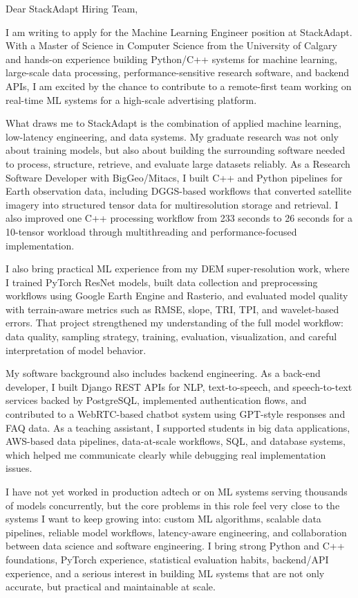 \documentclass[11pt]{letter}
\begin{document}
\begin{letter}{}

\opening{Dear StackAdapt Hiring Team,}

I am writing to apply for the Machine Learning Engineer position at StackAdapt. With a Master of Science in Computer Science from the University of Calgary and hands-on experience building Python/C++ systems for machine learning, large-scale data processing, performance-sensitive research software, and backend APIs, I am excited by the chance to contribute to a remote-first team working on real-time ML systems for a high-scale advertising platform.

What draws me to StackAdapt is the combination of applied machine learning, low-latency engineering, and data systems. My graduate research was not only about training models, but also about building the surrounding software needed to process, structure, retrieve, and evaluate large datasets reliably. As a Research Software Developer with BigGeo/Mitacs, I built C++ and Python pipelines for Earth observation data, including DGGS-based workflows that converted satellite imagery into structured tensor data for multiresolution storage and retrieval. I also improved one C++ processing workflow from 233 seconds to 26 seconds for a 10-tensor workload through multithreading and performance-focused implementation.

I also bring practical ML experience from my DEM super-resolution work, where I trained PyTorch ResNet models, built data collection and preprocessing workflows using Google Earth Engine and Rasterio, and evaluated model quality with terrain-aware metrics such as RMSE, slope, TRI, TPI, and wavelet-based errors. That project strengthened my understanding of the full model workflow: data quality, sampling strategy, training, evaluation, visualization, and careful interpretation of model behavior.

My software background also includes backend engineering. As a back-end developer, I built Django REST APIs for NLP, text-to-speech, and speech-to-text services backed by PostgreSQL, implemented authentication flows, and contributed to a WebRTC-based chatbot system using GPT-style responses and FAQ data. As a teaching assistant, I supported students in big data applications, AWS-based data pipelines, data-at-scale workflows, SQL, and database systems, which helped me communicate clearly while debugging real implementation issues.

I have not yet worked in production adtech or on ML systems serving thousands of models concurrently, but the core problems in this role feel very close to the systems I want to keep growing into: custom ML algorithms, scalable data pipelines, reliable model workflows, latency-aware engineering, and collaboration between data science and software engineering. I bring strong Python and C++ foundations, PyTorch experience, statistical evaluation habits, backend/API experience, and a serious interest in building ML systems that are not only accurate, but practical and maintainable at scale.


\end{letter}
\end{document}
